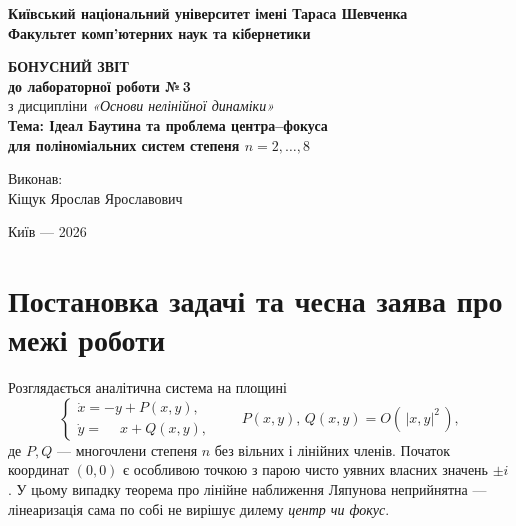 \documentclass[12pt,a4paper]{article}
\begin{document}
\begin{titlepage}
    \begin{center}
        \textbf{Київський національний університет імені Тараса Шевченка}\\
        \textbf{Факультет комп'ютерних наук та кібернетики}
    \end{center}

    \vspace{4cm}

    \begin{center}
        \textbf{\Large БОНУСНИЙ ЗВІТ}\\
        \vspace{0.5cm}
        \textbf{\large до лабораторної роботи №\,3}\\
        \vspace{0.5cm}
        з дисципліни \textit{«Основи нелінійної динаміки»}\\
        \vspace{0.7cm}
        \textbf{Тема: Ідеал Баутина та проблема центра--фокуса\\для поліноміальних систем степеня $n=2,\dots,8$}
    \end{center}

    \vfill

    \begin{flushright}
        Виконав:\\
        Кіщук Ярослав Ярославович
    \end{flushright}

    \vspace{1.5cm}

    \begin{center}
        Київ --- 2026
    \end{center}
\end{titlepage}

\tableofcontents
\newpage

\section{Постановка задачі та чесна заява про межі роботи}

Розглядається аналітична система на площині
\begin{equation}\label{eq:base}
\begin{cases}
\dot{x} = -y + P(x,y),\\[2pt]
\dot{y} = \phantom{-}x + Q(x,y),
\end{cases}
\qquad P(x,y),\,Q(x,y) = O(\,|x,y|^{2}\,),
\end{equation}
де $P, Q$ --- многочлени степеня $n$ без вільних і лінійних членів. Початок координат
$(0,0)$ є особливою точкою з парою чисто уявних власних значень $\pm i$. У цьому випадку
теорема про лінійне наближення Ляпунова неприйнятна --- лінеаризація сама по собі
не вирішує дилему \emph{центр чи фокус}.
\end{document}
